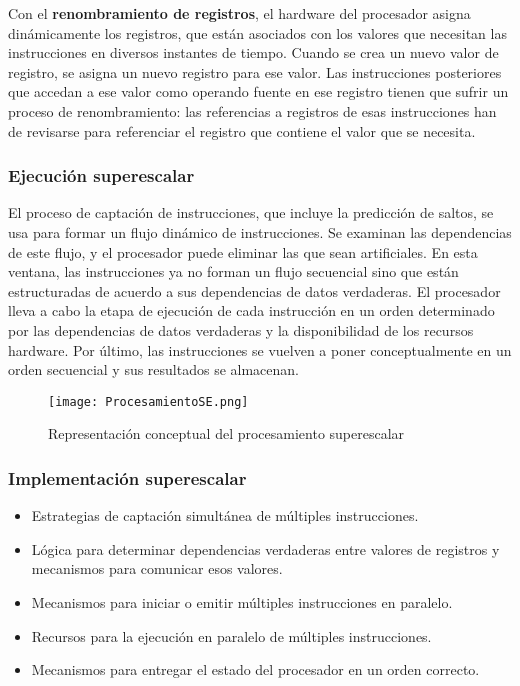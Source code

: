 Con el \textbf{renombramiento de registros}, el hardware del procesador asigna dinámicamente los registros, que están asociados con los valores que necesitan las instrucciones en diversos instantes de tiempo. Cuando se crea un nuevo valor de registro, se asigna un nuevo registro para ese valor. Las instrucciones posteriores que accedan a ese valor como operando fuente en ese registro tienen que sufrir un proceso de renombramiento: las referencias a registros de esas instrucciones han de revisarse para referenciar el registro que contiene el valor que se necesita.

\subsubsection*{Ejecución superescalar}

El proceso de captación de instrucciones, que incluye la predicción de saltos, se usa para formar un flujo dinámico de instrucciones. Se examinan las dependencias de este flujo, y el procesador puede eliminar las que sean artificiales. En esta ventana, las instrucciones ya no forman un flujo secuencial sino que están estructuradas de acuerdo a sus dependencias de datos verdaderas. El procesador lleva a cabo la etapa de ejecución de cada instrucción en un orden determinado por las dependencias de datos verdaderas y la disponibilidad de los recursos hardware. Por último, las instrucciones se vuelven a poner conceptualmente en un orden secuencial y sus resultados se almacenan.

\begin{figure}[H]
  \centering
  \texttt{[image: ProcesamientoSE.png]}
  \caption{Representación conceptual del procesamiento superescalar}
\end{figure}

\subsubsection*{Implementación superescalar}

\begin{itemize}
  \item Estrategias de captación simultánea de múltiples instrucciones.
  \item Lógica para determinar dependencias verdaderas entre valores de registros y mecanismos para comunicar esos valores.
  \item Mecanismos para iniciar o emitir múltiples instrucciones en paralelo.
  \item Recursos para la ejecución en paralelo de múltiples instrucciones.
  \item Mecanismos para entregar el estado del procesador en un orden correcto.
\end{itemize}

